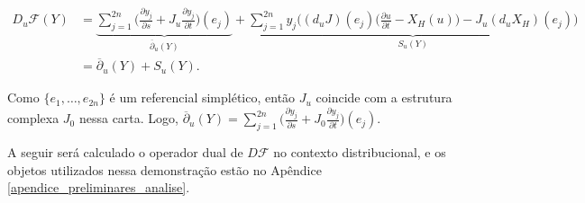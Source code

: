 \documentclass[12pt]{book}
\newcommand{\bigparenteses}[1]{\Big( #1 \Big) }
\newcommand{\campohamiltoniano}[1]{X_{H}(#1)}
\newcommand{\campohamiltonianoabrev}{X_{H}}
\newcommand{\diferencialfloer}{D\operadorFloer}
\newcommand{\diferencialfloerponto}[1]{D_{#1}\operadorFloer}
\newcommand{\derivadaparcial}[2]{\frac{\partial #1}{\partial #2}}
\newcommand{\estruturacomplexa}{J_{0}}
\newcommand{\operadorFloer}{\mathcal{F}}
\begin{document}
	$$
	\begin{aligned}
	\diferencialfloerponto{u}(Y)
	&=\underbrace{
		\sum_{j=1}^{2n}\bigparenteses{\derivadaparcial{y_{j}}{s}+J_{u}\derivadaparcial{y_{j}}{t}}(e_{j}) }_{	\overline{\partial}_{u}(Y)}
	+ \underbrace{\sum_{j=1}^{2n}
		y_{j}\bigparenteses{(d_{u}J)(e_{j})\bigparenteses{ \derivadaparcial{u}{t} - \campohamiltoniano{u}}-J_{u}(d_{u}\campohamiltonianoabrev)(e_{j})}}_{S_{u}(Y)}
	\\
	&=
	\overline{\partial}_{u}(Y)+S_{u}(Y).
	\end{aligned}
	$$
	
	Como $\{e_{1}, \dots,e_{2n} \}$ é um referencial simplético, então $J_{u}$ coincide com a estrutura complexa $\estruturacomplexa$ nessa carta. Logo, $	\overline{\partial}_{u}(Y) =\sum_{j=1}^{2n}\big( \derivadaparcial{y_{j}}{s}+\estruturacomplexa \derivadaparcial{y_{j}}{t}\big)(e_{j})$.
	
	A seguir será calculado o operador dual de $\diferencialfloer$ no contexto distribucional, e os objetos utilizados nessa demonstração estão no Apêndice \ref{apendice_preliminares_analise}.
\end{document}
